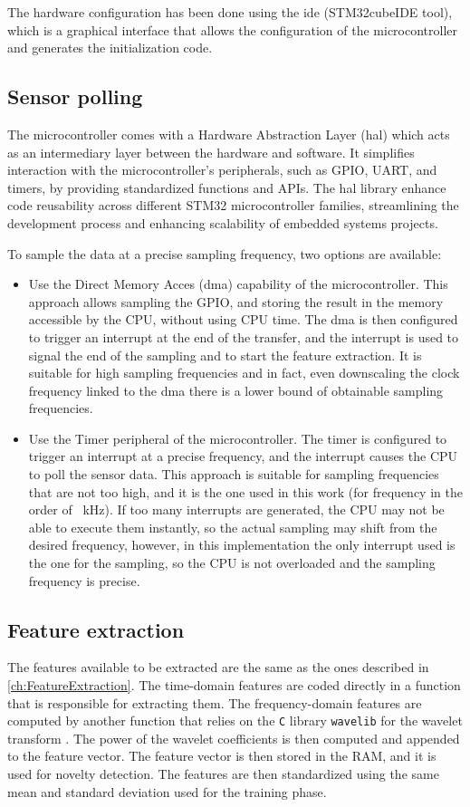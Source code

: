 The hardware configuration has been done using the \gls{ide} ({STM32cubeIDE} tool), which is a graphical interface that allows the configuration of the microcontroller and generates the initialization code. 

\subsection{Sensor polling}
The microcontroller comes with a Hardware Abstraction Layer (\gls{hal}) which acts as an intermediary layer between the hardware and software. It simplifies interaction with the microcontroller's peripherals, such as GPIO, UART, and timers, by providing standardized functions and APIs. The \gls{hal} library enhance code reusability across different STM32 microcontroller families, streamlining the development process and enhancing scalability of embedded systems projects.

To sample the data at a precise sampling frequency, two options are available:
\begin{itemize}
    \item Use the Direct Memory Acces (\gls{dma}) capability of the microcontroller. This approach allows sampling the GPIO, and storing the result in the memory accessible by the CPU, without using CPU time. The \gls{dma} is then configured to trigger an interrupt at the end of the transfer, and the interrupt is used to signal the end of the sampling and to start the feature extraction. It is suitable for high sampling frequencies and in fact, even downscaling the clock frequency linked to the \gls{dma} there is a lower bound of obtainable sampling frequencies.
    \item Use the Timer peripheral of the microcontroller. The timer is configured to trigger an interrupt at a precise frequency, and the interrupt causes the CPU to poll the sensor data. This approach is suitable for sampling frequencies that are not too high, and it is the one used in this work (for frequency in the order of \SI{ }{\kilo\hertz}).
    If too many interrupts are generated, the CPU may not be able to execute them instantly, so the actual sampling may shift from the desired frequency, however, in this implementation the only interrupt used is the one for the sampling, so the CPU is not overloaded and the sampling frequency is precise.
\end{itemize}


\subsection{Feature extraction}
The features available to be extracted are the same as the ones described in \autoref{ch:FeatureExtraction}. The time-domain features are coded directly in a function that is responsible for extracting them. The frequency-domain features are computed by another function that relies on the \texttt{C} library \texttt{wavelib} for the wavelet transform \cite{wavelib}. The power of the wavelet coefficients is then computed and appended to the feature vector. The feature vector is then stored in the RAM, and it is used for novelty detection.
The features are then standardized using the same mean and standard deviation used for the training phase. 

